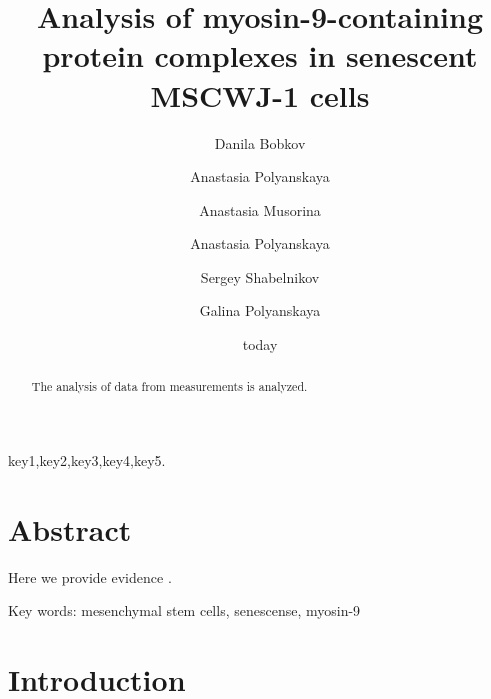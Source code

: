 \documentclass[english,authoryear]{elsarticle}
\title{Analysis of myosin-9-containing protein complexes in senescent MSCWJ-1 cells}
\begin{document}
\date{today}

\author[rvt]{Danila Bobkov}
\author[rvt]{Anastasia Polyanskaya}
\author[rvt]{Anastasia Musorina}
\author[rvt]{Anastasia Polyanskaya}
\author[rvt]{Sergey Shabelnikov}
\author[rvt]{Galina Polyanskaya}
\address[rvt]{Institute of Cytology of the Russian Academy of Science, 194064 Tikhoretsky ave. 4, St-Petersburg, Russia }


\begin{abstract}
The analysis of data from measurements is analyzed.
\end{abstract}

\begin{keyword}
key1\sep key2\sep key3\sep key4\sep key5.
\end{keyword}

\maketitle

\section{Abstract}

Here we provide evidence .

Key words: mesenchymal stem cells, senescense, myosin-9

\section{Introduction}
\end{document}
